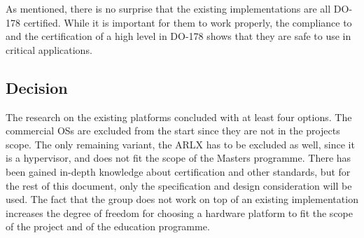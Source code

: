 As mentioned, there is no surprise that the existing
\arinc{} implementations are all DO-178 certified. While it is
important for them to work properly, the compliance to \arinc{} and the
certification of a high level in DO-178 shows that they are safe to use
in critical applications. %


\subsection{Decision}
The research on the existing \arinc{} platforms concluded with at
least four options. The commercial OSs are excluded from the start since
they are not in the project\textquotesingle s scope. The only remaining
variant, the ARLX has to be excluded as well, since it is a hypervisor,
and does not fit the scope of the Masters programme.
There has been gained in-depth knowledge about certification and other standards, but for the rest of this document, only the \arinc{}
specification and design consideration will be used.
The fact that the group does not work on top of an existing implementation
increases the degree of freedom for choosing a hardware platform to fit
the scope of the project and of the education programme.

